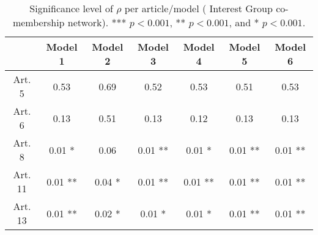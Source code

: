 \begin{table}[ht]
\centering
\begin{tabular}{ccccccc}
  \toprule
 & Model 1 & Model 2 & Model 3 & Model 4 & Model 5 & Model 6 \\ 
  \midrule
Art. 5 & 0.53   & 0.69   & 0.52   & 0.53   & 0.51   & 0.53   \\ 
   \midrule
Art. 6 & 0.13   & 0.51   & 0.13   & 0.12   & 0.13   & 0.13   \\ 
   \midrule
Art. 8 & 0.01 * & 0.06   & 0.01 ** & 0.01 * & 0.01 ** & 0.01 ** \\ 
   \midrule
Art. 11 & 0.01 ** & 0.04 * & 0.01 ** & 0.01 ** & 0.01 ** & 0.01 ** \\ 
   \midrule
Art. 13 & 0.01 ** & 0.02 * & 0.01 * & 0.01 * & 0.01 ** & 0.01 ** \\ 
   \bottomrule
\end{tabular}
\caption{Significance level of $\rho$ per article/model ( Interest Group co-membership network). *** $p < 0.001$, ** $p < 0.001$, and * $p < 0.001$.} 
\end{table}
